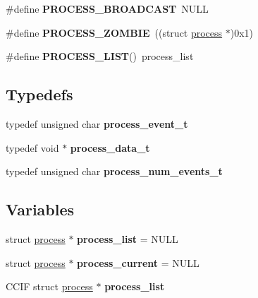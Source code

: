 \begin{DoxyCompactItemize}
\item 
\hypertarget{group__process_ga958ff4131a37eaf12b920da16749e3b7}{\#define {\bfseries P\-R\-O\-C\-E\-S\-S\-\_\-\-B\-R\-O\-A\-D\-C\-A\-S\-T}~N\-U\-L\-L}\label{group__process_ga958ff4131a37eaf12b920da16749e3b7}

\item 
\hypertarget{group__process_ga750b6b1b06aa8ba8ae1d72cff428f45a}{\#define {\bfseries P\-R\-O\-C\-E\-S\-S\-\_\-\-Z\-O\-M\-B\-I\-E}~((struct \hyperlink{structprocess}{process} $\ast$)0x1)}\label{group__process_ga750b6b1b06aa8ba8ae1d72cff428f45a}

\item 
\hypertarget{group__process_ga1cdf7dc0628e32a933f82de1d3d0d2ce}{\#define {\bfseries P\-R\-O\-C\-E\-S\-S\-\_\-\-L\-I\-S\-T}()~process\-\_\-list}\label{group__process_ga1cdf7dc0628e32a933f82de1d3d0d2ce}

\end{DoxyCompactItemize}
\subsection*{Typedefs}
\begin{DoxyCompactItemize}
\item 
\hypertarget{group__process_ga4d81d85c09c89d0e97cd0d239728a942}{typedef unsigned char {\bfseries process\-\_\-event\-\_\-t}}\label{group__process_ga4d81d85c09c89d0e97cd0d239728a942}

\item 
\hypertarget{group__process_gaacfecee3e853f3904a8e695de0f6649d}{typedef void $\ast$ {\bfseries process\-\_\-data\-\_\-t}}\label{group__process_gaacfecee3e853f3904a8e695de0f6649d}

\item 
\hypertarget{group__process_ga5071f7c273b5a622099737a01e828a06}{typedef unsigned char {\bfseries process\-\_\-num\-\_\-events\-\_\-t}}\label{group__process_ga5071f7c273b5a622099737a01e828a06}

\end{DoxyCompactItemize}
\subsection*{Variables}
\begin{DoxyCompactItemize}
\item 
\hypertarget{group__process_ga69c8a4d6b7be8c8fdaf3d9d42716786f}{struct \hyperlink{structprocess}{process} $\ast$ {\bfseries process\-\_\-list} = N\-U\-L\-L}\label{group__process_ga69c8a4d6b7be8c8fdaf3d9d42716786f}

\item 
\hypertarget{group__process_ga6093569fbb63502df10fd8ddb83727bf}{struct \hyperlink{structprocess}{process} $\ast$ {\bfseries process\-\_\-current} = N\-U\-L\-L}\label{group__process_ga6093569fbb63502df10fd8ddb83727bf}

\item 
\hypertarget{group__process_ga03302c412b77c7e2a8c5b3515e0ad93a}{C\-C\-I\-F struct \hyperlink{structprocess}{process} $\ast$ {\bfseries process\-\_\-list}}\label{group__process_ga03302c412b77c7e2a8c5b3515e0ad93a}

\end{DoxyCompactItemize}
